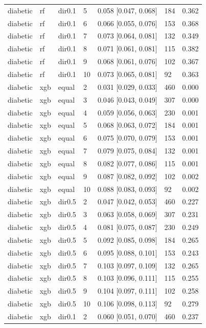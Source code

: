 \begin{tabular}{lllllll}
diabetic & rf & dir0.1 & 5 & 0.058 [0.047, 0.068] & 184 & 0.362 \\
diabetic & rf & dir0.1 & 6 & 0.066 [0.055, 0.076] & 153 & 0.368 \\
diabetic & rf & dir0.1 & 7 & 0.073 [0.064, 0.081] & 132 & 0.349 \\
diabetic & rf & dir0.1 & 8 & 0.071 [0.061, 0.081] & 115 & 0.382 \\
diabetic & rf & dir0.1 & 9 & 0.068 [0.061, 0.076] & 102 & 0.367 \\
diabetic & rf & dir0.1 & 10 & 0.073 [0.065, 0.081] & 92 & 0.363 \\
diabetic & xgb & equal & 2 & 0.031 [0.029, 0.033] & 460 & 0.000 \\
diabetic & xgb & equal & 3 & 0.046 [0.043, 0.049] & 307 & 0.000 \\
diabetic & xgb & equal & 4 & 0.059 [0.056, 0.063] & 230 & 0.001 \\
diabetic & xgb & equal & 5 & 0.068 [0.063, 0.072] & 184 & 0.001 \\
diabetic & xgb & equal & 6 & 0.075 [0.070, 0.079] & 153 & 0.001 \\
diabetic & xgb & equal & 7 & 0.079 [0.075, 0.084] & 132 & 0.001 \\
diabetic & xgb & equal & 8 & 0.082 [0.077, 0.086] & 115 & 0.001 \\
diabetic & xgb & equal & 9 & 0.087 [0.082, 0.092] & 102 & 0.002 \\
diabetic & xgb & equal & 10 & 0.088 [0.083, 0.093] & 92 & 0.002 \\
diabetic & xgb & dir0.5 & 2 & 0.047 [0.042, 0.053] & 460 & 0.227 \\
diabetic & xgb & dir0.5 & 3 & 0.063 [0.058, 0.069] & 307 & 0.231 \\
diabetic & xgb & dir0.5 & 4 & 0.081 [0.075, 0.087] & 230 & 0.249 \\
diabetic & xgb & dir0.5 & 5 & 0.092 [0.085, 0.098] & 184 & 0.265 \\
diabetic & xgb & dir0.5 & 6 & 0.095 [0.088, 0.101] & 153 & 0.243 \\
diabetic & xgb & dir0.5 & 7 & 0.103 [0.097, 0.109] & 132 & 0.265 \\
diabetic & xgb & dir0.5 & 8 & 0.103 [0.096, 0.111] & 115 & 0.255 \\
diabetic & xgb & dir0.5 & 9 & 0.104 [0.097, 0.111] & 102 & 0.258 \\
diabetic & xgb & dir0.5 & 10 & 0.106 [0.098, 0.113] & 92 & 0.279 \\
diabetic & xgb & dir0.1 & 2 & 0.060 [0.051, 0.070] & 460 & 0.237 \\

\end{tabular}
